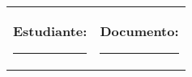     \setcounter{page}{1}
	{\setlength{\parindent}{-0.215cm}
\begin{tabular}{llll}
\multicolumn{3}{l}{\textbf{Estudiante:} \rule{11.32cm}{0.1mm}}                 & \hspace{-0.2cm}\textbf{Documento:} \rule{3cm}{0.1mm}
\end{tabular}}
	
\vspace{1em}